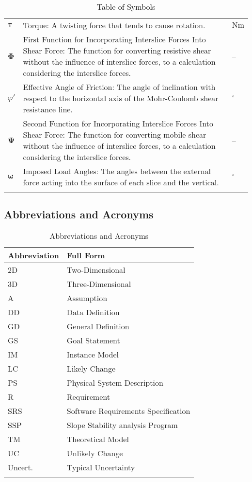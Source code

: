 \documentclass[12pt]{article}
\begin{document}
\begin{longtabu}{l X[l] l}
$\symbf{τ}$ & Torque: A twisting force that tends to cause rotation. & $\text{N}\text{m}$
\\
$\symbf{Φ}$ & First Function for Incorporating Interslice Forces Into Shear Force: The function for converting resistive shear without the influence of interslice forces, to a calculation considering the interslice forces. & --
\\
$φ'$ & Effective Angle of Friction: The angle of inclination with respect to the horizontal axis of the Mohr-Coulomb shear resistance line. & ${{}^{\circ}}$
\\
$\symbf{Ψ}$ & Second Function for Incorporating Interslice Forces Into Shear Force: The function for converting mobile shear without the influence of interslice forces, to a calculation considering the interslice forces. & --
\\
$\symbf{ω}$ & Imposed Load Angles: The angles between the external force acting into the surface of each slice and the vertical. & ${{}^{\circ}}$
\\
\bottomrule
\caption{Table of Symbols}
\label{Table:ToS}
\end{longtabu}
\subsection{Abbreviations and Acronyms}
\label{Sec:TAbbAcc}
\begin{longtable}{l l}
\toprule
\textbf{Abbreviation} & \textbf{Full Form}
\\
\midrule
\endhead
2D & Two-Dimensional
\\
3D & Three-Dimensional
\\
A & Assumption
\\
DD & Data Definition
\\
GD & General Definition
\\
GS & Goal Statement
\\
IM & Instance Model
\\
LC & Likely Change
\\
PS & Physical System Description
\\
R & Requirement
\\
SRS & Software Requirements Specification
\\
SSP & Slope Stability analysis Program
\\
TM & Theoretical Model
\\
UC & Unlikely Change
\\
Uncert. & Typical Uncertainty
\\
\bottomrule
\caption{Abbreviations and Acronyms}
\label{Table:TAbbAcc}
\end{longtable}
\end{document}
